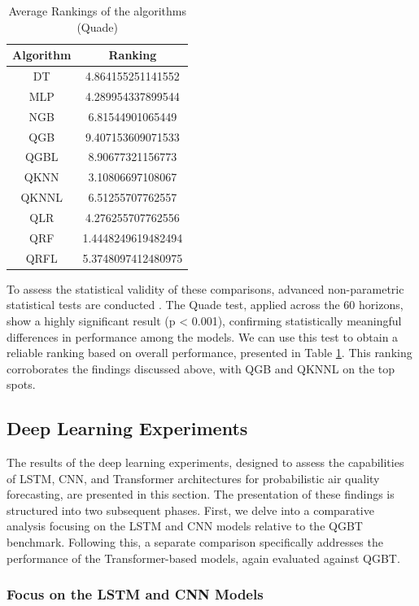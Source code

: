 \documentclass[12pt,a4paper]{book}
\begin{document}
\begin{table}[tbp]
  \centering \footnotesize
  \caption{\label{tab:exp1_quade}Average Rankings of the algorithms (Quade)}
  \begin{tabular}{c|c}
    Algorithm&Ranking\\
    \hline
    DT&4.864155251141552\\
    MLP&4.289954337899544\\
    NGB&6.81544901065449\\
    QGB&9.407153609071533\\
    QGBL&8.90677321156773\\
    QKNN&3.10806697108067\\
    QKNNL&6.51255707762557\\
    QLR&4.276255707762556\\
    QRF&1.4448249619482494\\
    QRFL&5.3748097412480975\\
    \end{tabular}
\end{table}

To assess the statistical validity of these comparisons, advanced non-parametric statistical tests are conducted \citep[as described by][]{garcia_advanced_2010}. The Quade test, applied across the 60 horizons, show a highly significant result (p < 0.001), confirming statistically meaningful differences in performance among the models. We can use this test to obtain a reliable ranking based on overall performance, presented in Table \ref{tab:exp1_quade}. This ranking corroborates the findings discussed above, with QGB and QKNNL on the top spots.

\subsection{Deep Learning Experiments}

The results of the deep learning experiments, designed to assess the capabilities of LSTM, CNN, and Transformer architectures for probabilistic air quality forecasting, are presented in this section. The presentation of these findings is structured into two subsequent phases. First, we delve into a comparative analysis focusing on the LSTM and CNN models relative to the QGBT benchmark. Following this, a separate comparison specifically addresses the performance of the Transformer-based models, again evaluated against QGBT.

\subsubsection{Focus on the LSTM and CNN Models}
\end{document}
